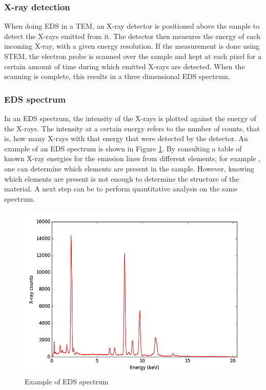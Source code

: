 		\subsubsection{X-ray detection}
When doing EDS in a TEM, an X-ray detector is positioned above the sample to detect the X-rays emitted from it. The detector then measures the energy of each incoming X-ray, with a given energy resolution. If the measurement is done using STEM, the electron probe is scanned over the sample and kept at each pixel for a certain amount of time during which emitted X-rays are detected. When the scanning is complete, this results in a three dimensional EDS spectrum.

		\subsubsection{EDS spectrum}\label{sec:eds-spec}
In an EDS spectrum, the intensity of the X-rays is plotted against the energy of the X-rays. The intensity at a certain energy refers to the number of counts, that is, how many X-rays with that energy that were detected by the detector. An example of an EDS spectrum is shown in Figure \ref{fig:eds-example-spectrum}. By consulting a table of known X-ray energies for the emission lines from different elements, for example \cite{x-ray-booklet}, one can determine which elements are present in the sample. However, knowing which elements are present is not enough to determine the structure of the material. A next step can be to perform quantitative analysis on the same spectrum.

\begin{figure}
\centering
\includegraphics[width=0.7\linewidth]{fig/edx-example-spectrum}
\caption{Example of EDS spectrum}
\label{fig:eds-example-spectrum}
\end{figure}

